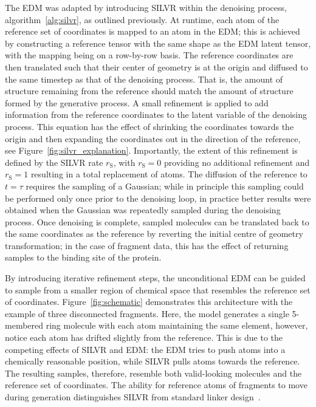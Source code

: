 \documentclass[journal=jacsat,manuscript=article]{achemso}
\begin{document}
The EDM was adapted by introducing SILVR within the denoising process, algorithm~\ref{alg:silvr}, as outlined previously. At runtime, each atom of the reference set of coordinates is mapped to an atom in the EDM; this is achieved by constructing a reference tensor with the same shape as the EDM latent tensor, with the mapping being on a row-by-row basis. The reference coordinates are then translated such that their center of geometry is at the origin and diffused to the same timestep as that of the denoising process. That is, the amount of structure remaining from the reference should match the amount of structure formed by the generative process. A small refinement is applied to add information from the reference coordinates to the latent variable of the denoising process. This equation has the effect of shrinking the coordinates towards the origin and then expanding the coordinates out in the direction of the reference, see Figure~\ref{fig:silvr_explanation}. Importantly, the extent of this refinement is defined by the SILVR rate $r_{\mathrm{S}}$, with $r_{\mathrm{S}}=0$ providing no additional refinement and $r_{\mathrm{S}}=1$ resulting in a total replacement of atoms. The diffusion of the reference to $t=\tau$ requires the sampling of a Gaussian; while in principle this sampling could be performed only once prior to the denoising loop, in practice better results were obtained when the Gaussian was repeatedly sampled during the denoising process. Once denoising is complete, sampled molecules can be translated back to the same coordinates as the reference by reverting the initial centre of geometry transformation; in the case of fragment data, this has the effect of returning samples to the binding site of the protein.

By introducing iterative refinement steps, the unconditional EDM can be guided to sample from a smaller region of chemical space that resembles the reference set of coordinates. Figure~\ref{fig:schematic} demonstrates this architecture with the example of three disconnected fragments. Here, the model generates a single 5-membered ring molecule with each atom maintaining the same element, however, notice each atom has drifted slightly from the reference. This is due to the competing effects of SILVR and EDM: the EDM tries to push atoms into a chemically reasonable position, while SILVR pulls atoms towards the reference. The resulting samples, therefore, resemble both valid-looking molecules and the reference set of coordinates. The ability for reference atoms of fragments to move during generation distinguishes SILVR from standard linker design~\cite{guo2023linkinvent, igashov2022equivariant}.
\end{document}
